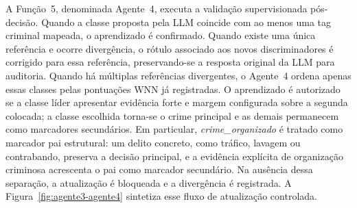 A Função~5, denominada Agente~4, executa a validação supervisionada pós-decisão. Quando a classe proposta pela LLM coincide com ao menos uma tag criminal mapeada, o aprendizado é confirmado. Quando existe uma única referência e ocorre divergência, o rótulo associado aos novos discriminadores é corrigido para essa referência, preservando-se a resposta original da LLM para auditoria. Quando há múltiplas referências divergentes, o Agente~4 ordena apenas essas classes pelas pontuações WNN já registradas. O aprendizado é autorizado se a classe líder apresentar evidência forte e margem configurada sobre a segunda colocada; a classe escolhida torna-se o crime principal e as demais permanecem como marcadores secundários. Em particular, \textit{crime\_organizado} é tratado como marcador pai estrutural: um delito concreto, como tráfico, lavagem ou contrabando, preserva a decisão principal, e a evidência explícita de organização criminosa acrescenta o pai como marcador secundário. Na ausência dessa separação, a atualização é bloqueada e a divergência é registrada. A Figura~\ref{fig:agente3-agente4} sintetiza esse fluxo de atualização controlada.

